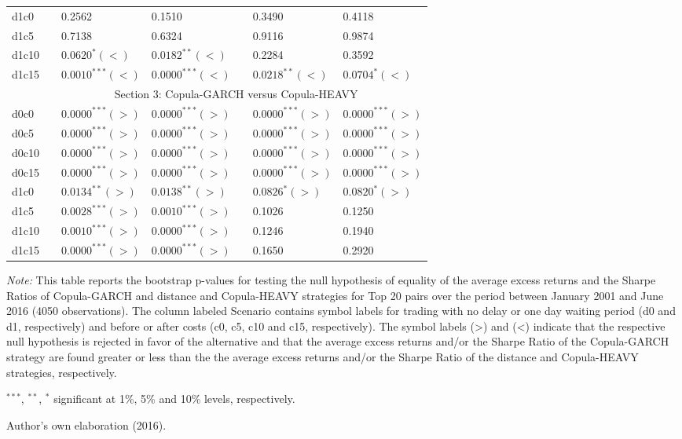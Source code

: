 \documentclass[a4paper,12pt]{report}
\begin{document}
\begin{refsection}
\begin{threeparttable}[H]
\begin{tabularx}{\textwidth}{@{\extracolsep{\fill}}lllllll@{}}
		d1c0 & & 0.2562 & 0.1510  &       & 0.3490 & 0.4118 \\
		d1c5 & & 0.7138 & 0.6324 &       & 0.9116 & 0.9874 \\
		d1c10 & & $0.0620^{*}(<)$ & $0.0182^{**}(<)$ &       & 0.2284 & 0.3592 \\
		d1c15 & & $0.0010^{***}(<)$ & $0.0000^{***}(<)$ &       & $0.0218^{**}(<)$ & $0.0704^{*}(<)$ \\
		\midrule
		& \multicolumn{6}{c}{Section 3: Copula-GARCH versus Copula-HEAVY} \\
		\midrule
		d0c0 & & $0.0000^{***}(>)$ & $0.0000^{***}(>)$ &       & $0.0000^{***}(>)$ & $0.0000^{***}(>)$ \\
		d0c5 & & $0.0000^{***}(>)$ & $0.0000^{***}(>)$ &       & $0.0000^{***}(>)$ & $0.0000^{***}(>)$   \\
		d0c10 & & $0.0000^{***}(>)$ & $0.0000^{***}(>)$ &       & $0.0000^{***}(>)$ & $0.0000^{***}(>)$ \\
		d0c15 & & $0.0000^{***}(>)$ & $0.0000^{***}(>)$ &       & $0.0000^{***}(>)$ & $0.0000^{***}(>)$ \\
		d1c0 & & $0.0134^{**}(>)$  & $0.0138^{**}(>)$  &       & $0.0826^{*}(>)$  & $0.0820^{*}(>)$ \\
		d1c5 & & $0.0028^{***}(>)$ & $0.0010^{***}(>)$ &       & 0.1026 & 0.1250 \\
		d1c10 & & $0.0010^{***}(>)$ & $0.0000^{***}(>)$ &       & 0.1246 & 0.1940 \\
		d1c15 & & $0.0000^{***}(>)$ & $0.0000^{***}(>)$ &       & 0.1650 & 0.2920 \\
		\bottomrule
	\end{tabularx}%
	\begin{tablenotes}
		\item \textit{Note:} \scriptsize This table reports the bootstrap p-values for testing the null hypothesis of equality of the average excess returns and the Sharpe Ratios of Copula-GARCH and distance and Copula-HEAVY strategies for Top 20 pairs over the period between January 2001 and June 2016 (4050 observations). The column labeled Scenario contains symbol labels for trading with no delay or one day waiting period (d0 and d1, respectively) and before or after costs (c0, c5, c10 and c15, respectively). The symbol labels (>) and (<) indicate that the respective null hypothesis is rejected in favor of the alternative and that the average excess returns and/or the Sharpe Ratio of the Copula-GARCH strategy are found greater or less than the the average excess returns and/or the Sharpe Ratio of the distance and Copula-HEAVY strategies, respectively.
		\item \scriptsize $^{\ast\ast\ast}$, $^{\ast\ast}$, $^{\ast}$ significant at 1\%, 5\% and 10\% levels, respectively.
		\item Author's own elaboration (2016).
	\end{tablenotes}
	\label{tab:table204}%
\end{threeparttable}%


\end{refsection}
\end{document}
